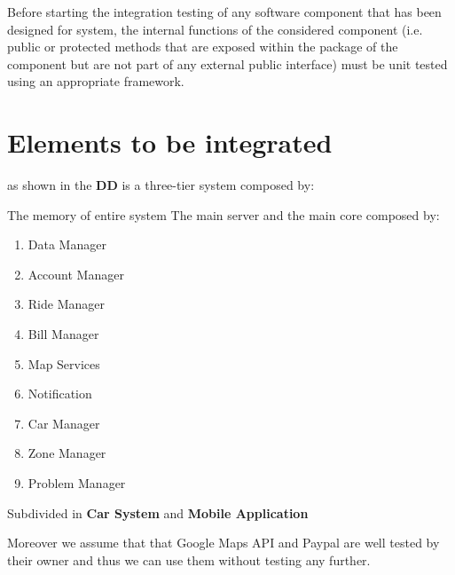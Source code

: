 Before starting the integration testing of any software component that has been designed for \PowerEnJoy{} system, the internal functions of the considered component (i.e. public or protected methods that are exposed within the package of the component but are not part of any external public interface) must be unit tested using an appropriate framework.
\section{Elements to be integrated}
\PowerEnJoy{} as shown in the \textbf{DD} is a three-tier system composed by:
\begin{itemize}
	 The memory of \PowerEnJoy{} entire system
	 The main server and the main core composed by:
		\begin{enumerate}
			\item Data Manager
			\item Account Manager
			\item Ride Manager
			\item Bill Manager
			\item Map Services
			\item Notification
			\item Car Manager
			\item Zone Manager
			\item Problem Manager
		\end{enumerate}
	 Subdivided in \textbf{Car System} and \textbf{Mobile Application}
\end{itemize}
Moreover we assume that that Google Maps API and Paypal are well tested by their owner and thus we can use them without testing any further.
